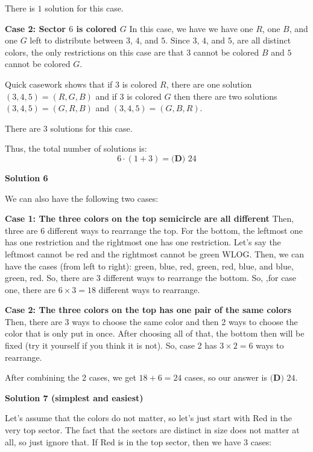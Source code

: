 \begin{enumerate}
 There is $1$ solution for this case.

 \textbf{Case 2: Sector $6$ is colored $G$} In this case, we have we have one $R$, one $B$, and one $G$ left to distribute between $3$, $4$, and $5$. Since $3$, $4$, and $5$, are all distinct colors, the only restrictions on this case are that $3$ cannot be colored $B$ and $5$ cannot be colored $G$.

 Quick casework shows that if $3$ is colored $R$, there are one solution $(3, 4, 5) = (R, G, B)$ and if $3$ is colored $G$ then there are two solutions $(3, 4, 5) = (G, R, B)$ and $(3, 4, 5) = (G, B, R)$.

 There are $3$ solutions for this case.

 


 Thus, the total number of solutions is: 
 \[6 \cdot (1 + 3) = \boxed{\textbf{(D) } 24}\]




\textbf{Solution 6}

We can also have the following two cases:

 \textbf{Case 1: The three colors on the top semicircle are all different} Then, three are 6 different ways to rearrange the top. For the bottom, the leftmost one has one restriction and the rightmost one has one restriction. Let's say the leftmost cannot be red and the rightmost cannot be green WLOG. Then, we can have the cases (from left to right): {green, blue, red}, {green, red, blue}, and {blue, green, red}. So, there are 3 different ways to rearrange the bottom. So, ,for case one, there are $6\times3=18$ different ways to rearrange.

 \textbf{Case 2: The three colors on the top has one pair of the same colors} Then, there are 3 ways to choose the same color and then 2 ways to choose the color that is only put in once. After choosing all of that, the bottom then will be fixed (try it yourself if you think it is not). So, case 2 has $3\times2=6$ ways to rearrange.

 After combining the 2 cases, we get $18+6=24$ cases, so our answer is $\boxed{\textbf{(D) } 24}$.

 



\textbf{Solution 7 (simplest and easiest)}

Let's assume that the colors do not matter, so let's just start with Red in the very top sector. The fact that the sectors are distinct in size does not matter at all, so just ignore that. If Red is in the top sector, then we have 3 cases:


\end{enumerate}
